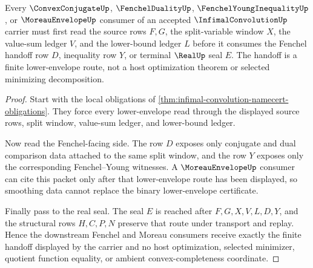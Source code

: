 \begin{theorem}
\label{thm:infimal-convolution-fenchel-handoff}
Every $\ConvexConjugateUp$, $\FenchelDualityUp$, $\FenchelYoungInequalityUp$, or $\MoreauEnvelopeUp$ consumer of an accepted $\InfimalConvolutionUp$ carrier must first read the source rows $F,G$, the split-variable window $X$, the value-sum ledger $V$, and the lower-bound ledger $L$ before it consumes the Fenchel handoff row $D$, inequality row $Y$, or terminal $\RealUp$ seal $E$. The handoff is a finite lower-envelope route, not a host optimization theorem or selected minimizing decomposition.
\end{theorem}
\begin{proof}
Start with the local obligations of \autoref{thm:infimal-convolution-namecert-obligations}. They force every lower-envelope read through the displayed source rows, split window, value-sum ledger, and lower-bound ledger.

Now read the Fenchel-facing side. The row $D$ exposes only conjugate and dual comparison data attached to the same split window, and the row $Y$ exposes only the corresponding Fenchel--Young witnesses. A $\MoreauEnvelopeUp$ consumer can cite this packet only after that lower-envelope route has been displayed, so smoothing data cannot replace the binary lower-envelope certificate.

Finally pass to the real seal. The seal $E$ is reached after $F,G,X,V,L,D,Y$, and the structural rows $H,C,P,N$ preserve that route under transport and replay. Hence the downstream Fenchel and Moreau consumers receive exactly the finite handoff displayed by the carrier and no host optimization, selected minimizer, quotient function equality, or ambient convex-completeness coordinate.
\end{proof}


\begin{closurestatus}{\InfimalConvolutionUp}
  \theoryclosure{\seedClosure}
  \formalstatus{\unformalizedV}
\end{closurestatus}
